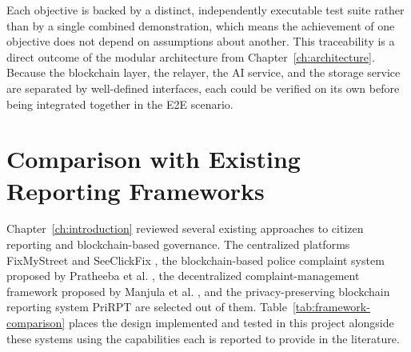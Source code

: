 Each objective is backed by a distinct, independently executable test suite rather than by a single combined demonstration, which means the achievement of one objective does not depend on assumptions about another. This traceability is a direct outcome of the modular architecture from Chapter~\ref{ch:architecture}. Because the blockchain layer, the relayer, the AI service, and the storage service are separated by well-defined interfaces, each could be verified on its own before being integrated together in the \ac{E2E} scenario.

\section{Comparison with Existing Reporting Frameworks}
\label{sec:comparison}

Chapter~\ref{ch:introduction} reviewed several existing approaches to citizen reporting and blockchain-based governance. The centralized platforms FixMyStreet \cite{Matthews2018} and SeeClickFix \cite{seeclickfix2011democracy}, the blockchain-based police complaint system proposed by Pratheeba et al. \cite{pratheeba_blockchain_police_complaint}, the decentralized complaint-management framework proposed by Manjula et al. \cite{manjula2025decentralized}, and the privacy-preserving blockchain reporting system PriRPT \cite{lin2023prirpt} are selected out of them. Table~\ref{tab:framework-comparison} places the design implemented and tested in this project alongside these systems using the capabilities each is reported to provide in the literature.


